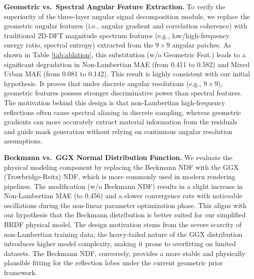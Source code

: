 \documentclass[lettersize,journal]{IEEEtran}
\begin{document}
\begin{table}[!t]
\centering\small
\caption{Ablation study results across different model configurations on the HCI benchmark. Lower is better for all MAE metrics. The best results for each row are highlighted in bold.}\label{tab:ablation}
\end{table}

\textbf{Geometric vs.\ Spectral Angular Feature Extraction.} 
To verify the superiority of the three-layer angular signal decomposition module, we replace the geometric angular features (i.e., angular gradient and correlation coherence) with traditional 2D-DFT magnitude spectrum features (e.g., low/high-frequency energy ratio, spectral entropy) extracted from the $9 \times 9$ angular patches. As shown in Table \ref{tab:ablation}, this substitution (w/o Geometric Feat.) leads to a significant degradation in Non-Lambertian MAE (from 0.411 to 0.582) and Mixed Urban MAE (from 0.081 to 0.142). This result is highly consistent with our initial hypothesis. It proves that under discrete angular resolutions (e.g., $9 \times 9$), geometric features possess stronger discriminative power than spectral features. The motivation behind this design is that non-Lambertian high-frequency reflections often cause spectral aliasing in discrete sampling, whereas geometric gradients can more accurately extract material information from the residuals and guide mask generation without relying on continuous angular resolution assumptions.

\textbf{Beckmann vs.\ GGX Normal Distribution Function.} 
We evaluate the physical modeling component by replacing the Beckmann NDF with the GGX (Trowbridge-Reitz) NDF, which is more commonly used in modern rendering pipelines. The modification (w/o Beckmann NDF) results in a slight increase in Non-Lambertian MAE (to 0.456) and a slower convergence rate with noticeable oscillations during the non-linear parameter optimization phase. This aligns with our hypothesis that the Beckmann distribution is better suited for our simplified BRDF physical model. The design motivation stems from the severe scarcity of non-Lambertian training data; the heavy-tailed nature of the GGX distribution introduces higher model complexity, making it prone to overfitting on limited datasets. The Beckmann NDF, conversely, provides a more stable and physically plausible fitting for the reflection lobes under the current geometric prior framework.
\end{document}
